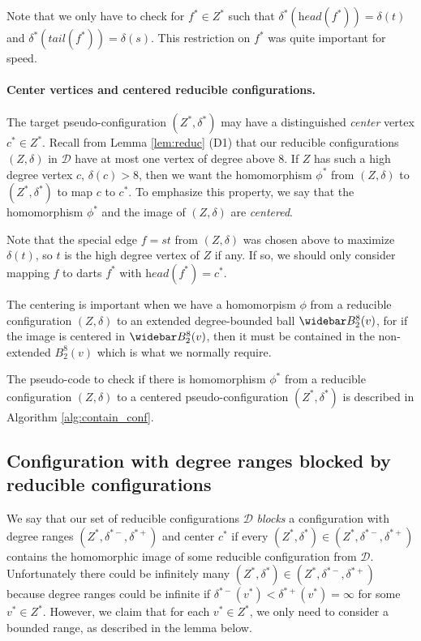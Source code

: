 \documentclass[10pt,a4paper]{article}
\renewcommand{\bar}{\widebar}
\def\head{\textit{head}}
\def\tail{\textit{tail}}
\def\cD{{\mathcal D}}
\begin{document}
Note that we only have to check for $f^*\in Z^*$ such that $\delta^*(\head(f^*))=\delta(t)$ and $\delta^*(\tail(f^*))=\delta(s)$. This restriction on $f^*$ was quite important for speed.


\paragraph{Center vertices and centered reducible configurations.}\label{para:center-vertices}
The target pseudo-configuration $(Z^*,\delta^*)$ may have a distinguished \emph{center} vertex $c^*\in Z^*$.
Recall from Lemma \ref{lem:reduc} (D1) that
our reducible configurations $(Z,\delta)$ in $\cD$ have at most one vertex of degree above $8$. 
If $Z$ has such a high degree vertex $c$, $\delta(c)>8$, then we
want the homomorphism $\phi^*$ from $(Z,\delta)$ to $(Z^*,\delta^*)$ to map
$c$ to $c^*$. To emphasize
this property, we say that the 
homomorphism $\phi^*$ and the image
of $(Z,\delta)$ are \emph{centered}.


Note that the special edge $f=st$ from $(Z,\delta)$ was chosen above to maximize $\delta(t)$, so $t$ is the high degree vertex of $Z$ if any. If so, we should only consider mapping $f$ to darts $f^*$ with
$\head(f^*)=c^*$.


The centering is important when we have a homomorpism $\phi$ from a reducible configuration $(Z,\delta)$
 to an extended degree-bounded ball
$\bar B_2^8(v)$, for if the image
is centered in $\bar B_2^8(v)$,
then it must be contained in the non-extended $B_2^8(v)$ which is what we normally require.

The pseudo-code to check if there is homomorphism $\phi^*$ from a reducible configuration $(Z,\delta)$ to a centered pseudo-configuration $(Z^*,\delta^*)$
is described in Algorithm \ref{alg:contain_conf}. 

\subsection{Configuration with degree ranges blocked by reducible configurations}\label{sect:block}

We say that our set of reducible configurations $\cD$ 
\emph{blocks} a configuration with degree ranges $(Z^*,\delta^{*-},\delta^{*+})$ and center $c^*$ if every $
(Z^*,\delta^*)\in(Z^*,\delta^{*-},\delta^{*+})$ contains the homomorphic image of some reducible configuration from $\cD$. Unfortunately there could be infinitely many $(Z^*,\delta^*)\in (Z^*,\delta^{*-},\delta^{*+})$
because degree ranges could be infinite if $\delta^{*-}(v^*)<
\delta^{*+}(v^*)=\infty$ for some $v^*\in Z^*$. However, we claim that for each $v^*\in Z^*$, we only need to consider
a bounded range, as described in the lemma below.
\end{document}
